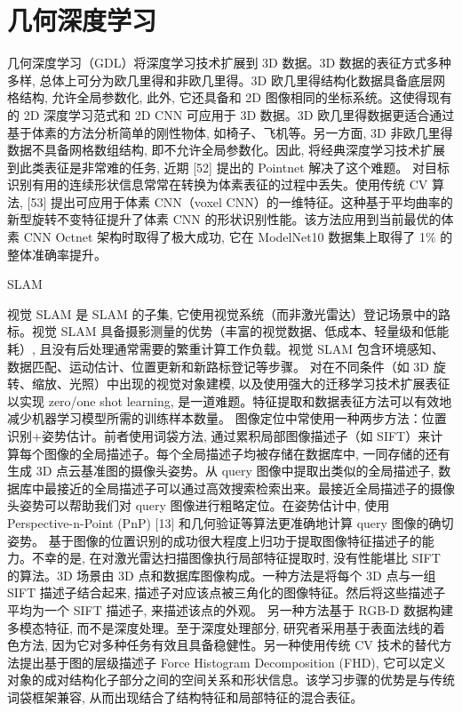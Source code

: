 \section{几何深度学习}
几何深度学习（GDL）将深度学习技术扩展到 3D 数据。3D 数据的表征方式多种多样, 总体上可分为欧几里得和非欧几里得。3D 欧几里得结构化数据具备底层网格结构, 允许全局参数化, 此外, 它还具备和 2D 图像相同的坐标系统。这使得现有的 2D 深度学习范式和 2D CNN 可应用于 3D 数据。3D 欧几里得数据更适合通过基于体素的方法分析简单的刚性物体, 如椅子、飞机等。另一方面, 3D 非欧几里得数据不具备网格数组结构, 即不允许全局参数化。因此, 将经典深度学习技术扩展到此类表征是非常难的任务, 近期 [52] 提出的 Pointnet 解决了这个难题。
对目标识别有用的连续形状信息常常在转换为体素表征的过程中丢失。使用传统 CV 算法, [53] 提出可应用于体素 CNN（voxel CNN）的一维特征。这种基于平均曲率的新型旋转不变特征提升了体素 CNN 的形状识别性能。该方法应用到当前最优的体素 CNN Octnet 架构时取得了极大成功, 它在 ModelNet10 数据集上取得了 1\% 的整体准确率提升。

SLAM

视觉 SLAM 是 SLAM 的子集, 它使用视觉系统（而非激光雷达）登记场景中的路标。视觉 SLAM 具备摄影测量的优势（丰富的视觉数据、低成本、轻量级和低能耗）, 且没有后处理通常需要的繁重计算工作负载。视觉 SLAM 包含环境感知、数据匹配、运动估计、位置更新和新路标登记等步骤。
对在不同条件（如 3D 旋转、缩放、光照）中出现的视觉对象建模, 以及使用强大的迁移学习技术扩展表征以实现 zero/one shot learning, 是一道难题。特征提取和数据表征方法可以有效地减少机器学习模型所需的训练样本数量。
图像定位中常使用一种两步方法：位置识别+姿势估计。前者使用词袋方法, 通过累积局部图像描述子（如 SIFT）来计算每个图像的全局描述子。每个全局描述子均被存储在数据库中, 一同存储的还有生成 3D 点云基准图的摄像头姿势。从 query 图像中提取出类似的全局描述子, 数据库中最接近的全局描述子可以通过高效搜索检索出来。最接近全局描述子的摄像头姿势可以帮助我们对 query 图像进行粗略定位。在姿势估计中, 使用 Perspective-n-Point (PnP) [13] 和几何验证等算法更准确地计算 query 图像的确切姿势。
基于图像的位置识别的成功很大程度上归功于提取图像特征描述子的能力。不幸的是, 在对激光雷达扫描图像执行局部特征提取时, 没有性能堪比 SIFT 的算法。3D 场景由 3D 点和数据库图像构成。一种方法是将每个 3D 点与一组 SIFT 描述子结合起来, 描述子对应该点被三角化的图像特征。然后将这些描述子平均为一个 SIFT 描述子, 来描述该点的外观。
另一种方法基于 RGB-D 数据构建多模态特征, 而不是深度处理。至于深度处理部分, 研究者采用基于表面法线的着色方法, 因为它对多种任务有效且具备稳健性。另一种使用传统 CV 技术的替代方法提出基于图的层级描述子 Force Histogram Decomposition (FHD), 它可以定义对象的成对结构化子部分之间的空间关系和形状信息。该学习步骤的优势是与传统词袋框架兼容, 从而出现结合了结构特征和局部特征的混合表征。

